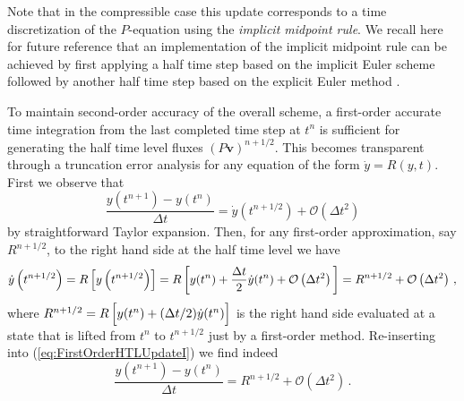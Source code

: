 \documentclass[12pt,a4paper]{article}
\theoremstyle{definition}
\newcommand{\eq}[1]{(\ref{#1})}
\newcommand{\vect}[1]{{\mathbf{#1}}}
\newcommand{\vv}{\vect{v}}
\newcommand{\half}{1/2}
\newcommand{\dt}{\Delta t}
\newcommand{\bigoh}[1]{\mathcal{O}\left(#1\right)}
\begin{document}
Note that in the compressible case this update corresponds to a time 
discretization of the $P$-equation
using the \emph{implicit midpoint rule}. We recall here for future reference that
an implementation of the implicit midpoint rule can be achieved by first applying
a half time step based on the implicit Euler scheme followed by another half time
step based on the explicit Euler method \cite{HairerEtAl2006}.

To maintain second-order accuracy of the overall scheme, a first-order accurate 
time integration from the last completed time step at $t^n$ is sufficient for 
generating the half time level fluxes $(P\vv)^{n+\half}$. This becomes transparent through a truncation error analysis for any equation of 
the form $\dot y = R(y,t)$. First we observe that
%
\begin{equation}\label{eq:FirstOrderHTLUpdateI}
\frac{y(t^{n+1})-y(t^n)}{\dt} = \dot y\left(t^{n+\half}\right) + \bigoh{\dt^2}
\end{equation}
%
by straightforward Taylor expansion. Then, for any first-order approximation, 
say $R^{n+\half}$, to the right hand side at the half time level we have  
%
\begin{equation}\label{eq:FirstOrderHTLUpdateII}
\dot y\left(t^{n+\half}\right) 
= R\left[y\left(t^{n+\half}\right)\right] 
= R\left[y(t^n) + \frac{\Delta t}{2} \dot y(t^n) + \bigoh{\Delta t^2}\rule{0pt}{12pt}\right]
= R^{n+\half} + \bigoh{\dt^2}\,,
\end{equation}
%
where $R^{n+\half} = R\left[y(t^n) + (\Delta t/2) \dot y(t^n)\rule{0pt}{10pt}\right]$ is the right hand side evaluated at a state that is lifted from $t^n$ to $t^{n+\half}$ just by a first-order method. Re-inserting into \eq{eq:FirstOrderHTLUpdateI} we find indeed
%
\begin{equation}
\frac{y(t^{n+1})-y(t^n)}{\dt} = R^{n+\half} + \bigoh{\dt^2}\, .
\end{equation}
%
\end{document}
